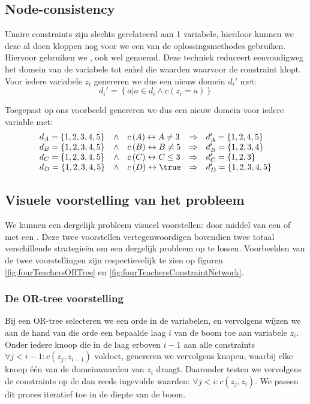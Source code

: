 \subsection{Node-consistency}
Unaire constraints zijn slechts gerelateerd aan 1 variabele, hierdoor kunnen we deze al doen kloppen nog voor we een van de oplossingsmethodes gebruiken. Hiervoor gebruiken we , ook wel  genoemd. Deze techniek reduceert eenvoudigweg het domein van de variabele tot enkel die waarden waarvoor de constraint klopt. Voor iedere variabele $z_i$ genereren we dus een nieuw domein $d_i'$ met:
\begin{equation}
d_i'=\left\{a|a\in d_i\wedge c\left(z_i=a\right)\right\}
\end{equation}
\begin{leftbar}
Toegepast op ons voorbeeld genereren we dus een nieuw domein voor iedere variable met:
\begin{equation}
\begin{array}{lclcl}
d_A=\left\{1,2,3,4,5\right\}&\wedge&c\left(A\right)\leftrightarrow A\neq 3&\Rightarrow&d_A'=\left\{1,2,4,5\right\}\\
d_B=\left\{1,2,3,4,5\right\}&\wedge&c\left(B\right)\leftrightarrow B\neq 5&\Rightarrow&d_B'=\left\{1,2,3,4\right\}\\
d_C=\left\{1,2,3,4,5\right\}&\wedge&c\left(C\right)\leftrightarrow C\leq 3&\Rightarrow&d_C'=\left\{1,2,3\right\}\\
d_D=\left\{1,2,3,4,5\right\}&\wedge&c\left(D\right)\leftrightarrow\true&\Rightarrow&d_D'=\left\{1,2,3,4,5\right\}
\end{array}
\end{equation}
\end{leftbar}
\subsection{Visuele voorstelling van het probleem}
We kunnen een dergelijk probleem visueel voorstellen: door middel van een  of met een . Deze twee voorstellen vertegenwoordigen bovendien twee totaal verschillende strategie\"en om een dergelijk probleem op te lossen. Voorbeelden van de twee voorstellingen zijn respectievelijk te zien op figuren \ref{fig:fourTeachersORTree} en \ref{fig:fourTeachersConstraintNetwork}.
\subsubsection{De OR-tree voorstelling}
Bij een OR-tree selecteren we een orde in de variabelen, en vervolgens wijzen we aan de hand van die orde een bepaalde laag $i$ van de boom toe aan variabele $z_i$. Onder iedere knoop die in de laag erboven $i-1$ aan alle constraints $\forall j<i-1: c\left(z_j,z_{i-1}\right)$ voldoet, genereren we vervolgens knopen, waarbij elke knoop \'e\'en van de domeinwaarden van $z_i$ draagt. Daaronder testen we vervolgens de constraints op de dan reeds ingevulde waarden: $\forall j<i: c\left(z_j,z_{i}\right)$. We passen dit proces iteratief toe in de diepte van de boom.
